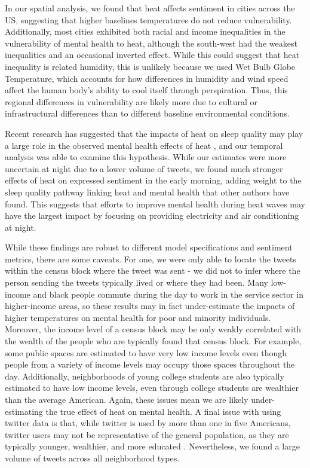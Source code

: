 \documentclass{article}
\begin{document}
In our spatial analysis, we found that heat affects sentiment in cities across the US, suggesting that higher baselines temperatures do not reduce vulnerability.   Additionally, most cities exhibited both racial and income inequalities in the vulnerability of mental health to heat, although the south-west had the weakest inequalities and an occasional inverted effect.  While this could suggest that heat inequality is related humidity, this is unlikely because we used Wet Bulb Globe Temperature, which accounts for how differences in humidity and wind speed affect the human body's ability to cool itself through perspiration.  Thus, this regional differences in vulnerability are likely more due to cultural or infrastructural differences than to different baseline environmental conditions.

Recent research has suggested that the impacts of heat on sleep quality may play a large role in the observed mental health effects of heat \cite{Obradovich2017May, Mullins2019Dec}, and our temporal analysis was able to examine this hypothesis.  While our estimates were more uncertain at night due to a lower volume of tweets, we found much stronger effects of heat on expressed sentiment in the early morning, adding weight to the sleep quality pathway linking heat and mental health that other authors have found.  This suggests that efforts to improve mental health during heat waves may have the largest impact by focusing on providing electricity and air conditioning at night.

While these findings are robust to different model specifications and sentiment metrics, there are some caveats.  For one, we were only able to locate the tweets within the census block where the tweet was sent - we did not to infer where the person sending the tweets typically lived or where they had been.  Many low-income and black people commute during the day to work in the service sector in higher-income areas, so these results may in fact under-estimate the impacts of higher temperatures on mental health for poor and minority individuals.  Moreover, the income level of a census block may be only weakly correlated with the wealth of the people who are typically found that census block.  For example, some public spaces are estimated to have very low income levels even though people from a variety of income levels may occupy those spaces throughout the day.  Additionally, neighborhoods of young college students are also typically estimated to have low income levels, even through college students are wealthier than the average American.  Again, these issues mean we are likely under-estimating the true effect of heat on mental health.  A final issue with using twitter data is that, while twitter is used by more than one in five Americans, twitter users may not be representative of the general population, as they are typically younger, wealthier, and more educated \cite{Pew2020Sep}.  Nevertheless, we found a large volume of tweets across all neighborhood types.
\end{document}

